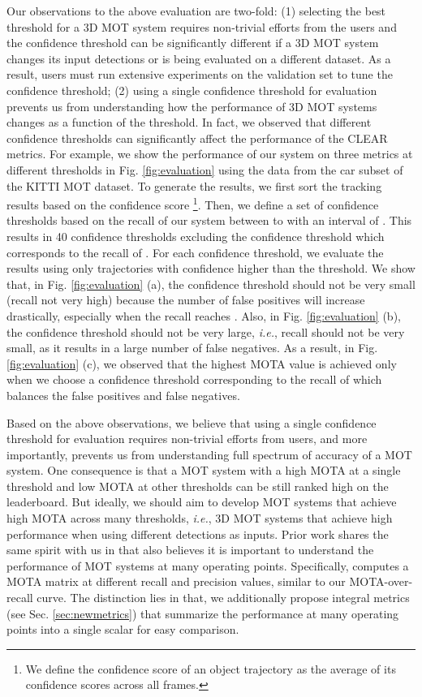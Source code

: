 \documentclass[letterpaper, 10 pt, conference]{ieeeconf}
\begin{document}
Our observations to the above evaluation are two-fold: (1) selecting the best threshold for a 3D MOT system requires non-trivial efforts from the users and the confidence threshold can be significantly different if a 3D MOT system changes its input detections or is being evaluated on a different dataset. As a result, users must run extensive experiments on the validation set to tune the confidence threshold; (2) using a single confidence threshold for evaluation prevents us from understanding how the performance of 3D MOT systems changes as a function of the threshold. In fact, we observed that different confidence thresholds can significantly affect the performance of the CLEAR metrics. For example, we show the performance of our system on three metrics at different thresholds in Fig. \ref{fig:evaluation} using the data from the car subset of the KITTI MOT dataset. To generate the results, we first sort the tracking results based on the confidence score \footnote{We define the confidence score of an object trajectory as the average of its confidence scores across all frames.}. Then, we define a set of confidence thresholds based on the recall of our system between  to  with an interval of . This results in 40 confidence thresholds excluding the confidence threshold which corresponds to the recall of . For each confidence threshold, we evaluate the results using only trajectories with confidence higher than the threshold. We show that, in Fig. \ref{fig:evaluation} (a), the confidence threshold should not be very small (recall not very high) because the number of false positives will increase drastically, especially when the recall reaches . Also, in Fig. \ref{fig:evaluation} (b), the confidence threshold should not be very large, \emph{i.e.}, recall should not be very small, as it results in a large number of false negatives. As a result, in Fig. \ref{fig:evaluation} (c), we observed that the highest MOTA value is achieved only when we choose a confidence threshold corresponding to the recall of  which balances the false positives and false negatives.

Based on the above observations, we believe that using a single confidence threshold for evaluation requires non-trivial efforts from users, and more importantly, prevents us from understanding full spectrum of accuracy of a MOT system. One consequence is that a MOT system with a high MOTA at a single threshold and low MOTA at other thresholds can be still ranked high on the leaderboard. But ideally, we should aim to develop MOT systems that achieve high MOTA across many thresholds, \emph{i.e.}, 3D MOT systems that achieve high performance when using different detections as inputs. Prior work \cite{Solera2015} shares the same spirit with us in that \cite{Solera2015} also believes it is important to understand the performance of MOT systems at many operating points. Specifically, \cite{Solera2015} computes a MOTA matrix at different recall and precision values, similar to our MOTA-over-recall curve. The distinction lies in that, we additionally propose integral metrics (see Sec. \ref{sec:newmetrics}) that summarize the performance at many operating points into a single scalar for easy comparison.
\end{document}
